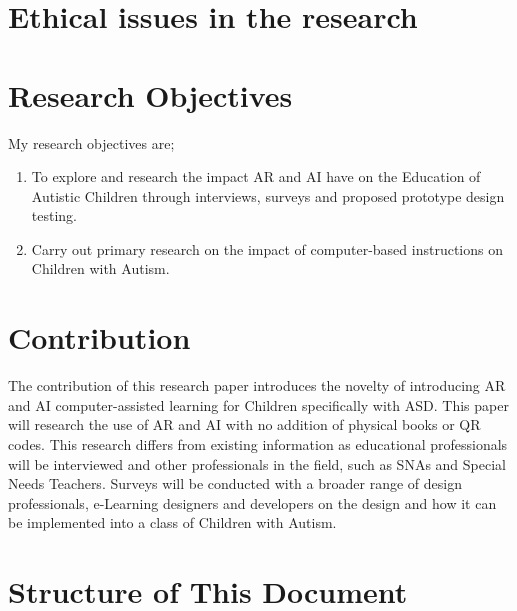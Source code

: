 \section{Ethical issues in the research}

\section{Research Objectives}
My research objectives are;
\begin{enumerate}
    \item To explore and research the impact AR and AI have on the Education of Autistic Children through interviews, surveys and proposed prototype design testing.
    \item Carry out primary research on the impact of computer-based instructions on Children with Autism.
\end{enumerate}

\section{Contribution}
The contribution of this research paper introduces the novelty of introducing AR and AI computer-assisted learning for Children specifically with ASD. This paper will research the use of AR and AI with no addition of physical books or QR codes. This research differs from existing information as educational professionals will be interviewed and other professionals in the field, such as SNAs and Special Needs Teachers. Surveys will be conducted with a broader range of design professionals, e-Learning designers and developers on the design and how it can be implemented into a class of Children with Autism. 


\section{Structure of This Document}

